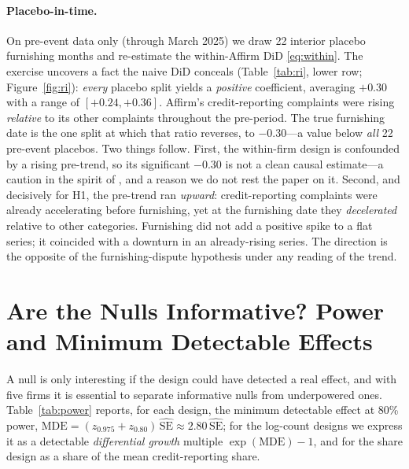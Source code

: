 \documentclass[12pt]{article}
\begin{document}
\paragraph{Placebo-in-time.} On pre-event data only (through March 2025) we draw 22 interior
placebo furnishing months and re-estimate the within-Affirm DiD \eqref{eq:within}. The exercise
uncovers a fact the naive DiD conceals (Table~\ref{tab:ri}, lower row; Figure~\ref{fig:ri}):
\emph{every} placebo split yields a \emph{positive} coefficient, averaging $+0.30$ with a range
of $[+0.24,+0.36]$. Affirm's credit-reporting complaints were rising \emph{relative} to its
other complaints throughout the pre-period. The true furnishing date is the one split at which
that ratio reverses, to $-0.30$---a value below \emph{all} 22 pre-event placebos. Two things
follow. First, the within-firm design is confounded by a rising pre-trend, so its significant
$-0.30$ is not a clean causal estimate---a caution in the spirit of \citet{roth2022}, and a
reason we do not rest the paper on it. Second, and decisively for H1, the pre-trend ran
\emph{upward}: credit-reporting complaints were already accelerating before furnishing, yet at
the furnishing date they \emph{decelerated} relative to other categories. Furnishing did not add
a positive spike to a flat series; it coincided with a downturn in an already-rising series. The
direction is the opposite of the furnishing-dispute hypothesis under any reading of the trend.

\section{Are the Nulls Informative? Power and Minimum Detectable Effects}\label{sec:power}
A null is only interesting if the design could have detected a real effect, and with five firms
it is essential to separate informative nulls from underpowered ones. Table~\ref{tab:power}
reports, for each design, the minimum detectable effect at 80\% power,
$\text{MDE}=(z_{0.975}+z_{0.80})\,\widehat{\text{SE}}\approx 2.80\,\widehat{\text{SE}}$; for the
log-count designs we express it as a detectable \emph{differential growth} multiple
$\exp(\text{MDE})-1$, and for the share design as a share of the mean credit-reporting share.
\end{document}
